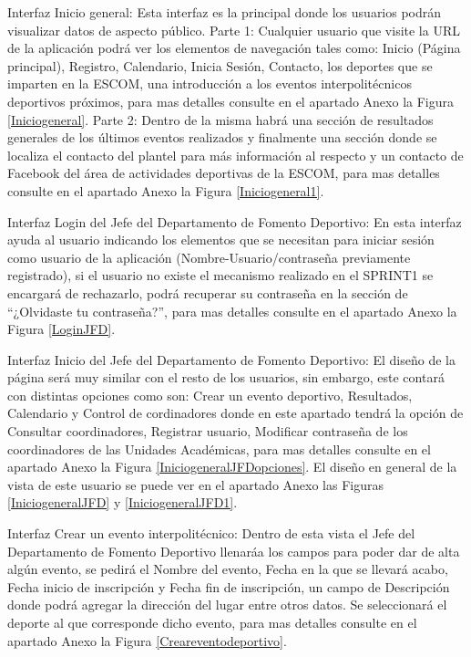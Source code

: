 	\noindent Interfaz Inicio general: Esta interfaz es la principal donde los usuarios podrán visualizar datos de aspecto público. 
	\newline
	Parte 1:
	Cualquier usuario que visite la URL de la aplicación podrá ver los elementos de navegación tales como: Inicio (Página principal), Registro, Calendario, Inicia Sesión, Contacto, los deportes que se imparten en la ESCOM, una introducción a los eventos interpolitécnicos deportivos próximos, para mas detalles consulte en el apartado Anexo la Figura \ref{Iniciogeneral}.
	\newline
	Parte 2:
	Dentro de la misma habrá una sección de resultados generales de los últimos eventos realizados y finalmente una  sección donde se localiza el contacto del plantel para más información al respecto y un contacto de Facebook del área de actividades deportivas de la ESCOM, para mas detalles consulte en el apartado Anexo la Figura \ref{Iniciogeneral1}.
	\newline
	
	\noindent Interfaz Login del Jefe del Departamento de Fomento Deportivo: En esta interfaz ayuda al usuario indicando los elementos que se necesitan para iniciar sesión como usuario de la aplicación (Nombre-Usuario/contraseña previamente registrado), si el usuario no existe el mecanismo realizado en el SPRINT1 se encargará de rechazarlo, podrá recuperar su contraseña en la sección de “¿Olvidaste tu contraseña?”, para mas detalles consulte en el apartado Anexo la Figura 	\ref{LoginJFD}. 
	\newline
	
	\noindent Interfaz Inicio del Jefe del Departamento de Fomento Deportivo: El diseño de la página será muy similar con el resto de los usuarios, sin embargo, este contará con distintas opciones como son: Crear un evento deportivo, Resultados, Calendario y Control de cordinadores donde en este apartado tendrá la opción de Consultar coordinadores, Registrar usuario, Modificar contraseña de los coordinadores de las Unidades Académicas, para mas detalles consulte en el apartado Anexo la Figura 	\ref{IniciogeneralJFDopciones}. El diseño en general de la vista de este usuario se puede ver en el apartado Anexo las Figuras \ref{IniciogeneralJFD} y \ref{IniciogeneralJFD1}.
	\newline
	
	\noindent Interfaz Crear un evento interpolitécnico: Dentro de esta vista el Jefe del Departamento de Fomento Deportivo llenaráa los campos para poder dar de alta algún evento, se pedirá el Nombre del evento, Fecha en la que se llevará acabo, Fecha inicio de inscripción y Fecha fin de inscripción, un campo de Descripción donde podrá agregar la dirección del lugar entre otros datos. Se seleccionará el deporte al que corresponde dicho evento, para mas detalles consulte en el apartado Anexo la Figura \ref{Creareventodeportivo}.
	\newline
	
